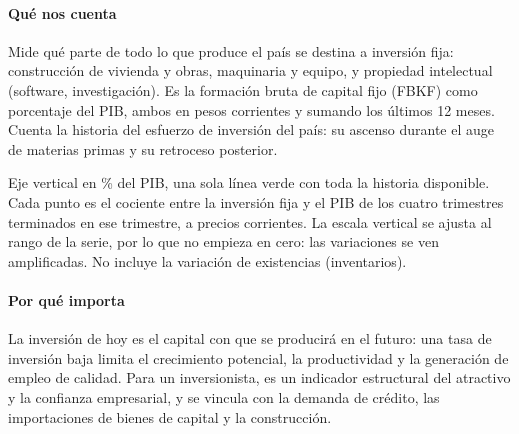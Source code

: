 \paragraph{Qué nos cuenta}
Mide qué parte de todo lo que produce el país se destina a inversión fija: construcción de vivienda y obras, maquinaria y equipo, y propiedad intelectual (software, investigación). Es la formación bruta de capital fijo (FBKF) como porcentaje del PIB, ambos en pesos corrientes y sumando los últimos 12 meses. Cuenta la historia del esfuerzo de inversión del país: su ascenso durante el auge de materias primas y su retroceso posterior.

\begin{leer}
Eje vertical en \% del PIB, una sola línea verde con toda la historia disponible. Cada punto es el cociente entre la inversión fija y el PIB de los cuatro trimestres terminados en ese trimestre, a precios corrientes. La escala vertical se ajusta al rango de la serie, por lo que no empieza en cero: las variaciones se ven amplificadas. No incluye la variación de existencias (inventarios).
\end{leer}

\paragraph{Por qué importa}
La inversión de hoy es el capital con que se producirá en el futuro: una tasa de inversión baja limita el crecimiento potencial, la productividad y la generación de empleo de calidad. Para un inversionista, es un indicador estructural del atractivo y la confianza empresarial, y se vincula con la demanda de crédito, las importaciones de bienes de capital y la construcción.

